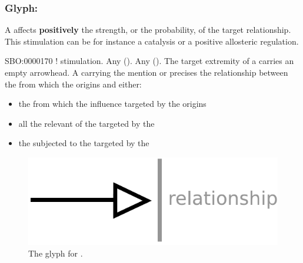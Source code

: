
\subsubsection{Glyph: }\label{sec:stimulation}

A  affects \textbf{positively} the strength, or the probability, of the target relationship. This stimulation can be for instance a catalysis or a positive allosteric regulation.

\begin{glyphDescription}
 \glyphSboTerm SBO:0000170 ! stimulation.
 \glyphOrigin Any  ().
 \glyphTarget Any  ().
 \glyphEndPoint The target extremity of a  carries an empty arrowhead.
 \glyphAux A  carrying the mention  or  precises the relationship between the  from which the  origins and either:
\begin{itemize}
\item the  from which the influence targeted by the  origins
\item all the relevant  of the  targeted by the 
\item the  subjected to the  targeted by the 
\end{itemize}
 \end{glyphDescription}

\begin{figure}[H]
  \centering
  \includegraphics[scale = 0.5]{images/stimulation}
  \caption{The \ER glyph for .}
  \label{fig:stimulation}
\end{figure}

